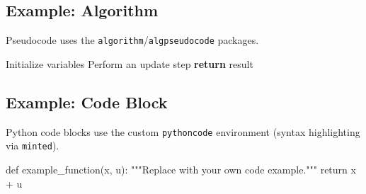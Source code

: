 \subsection{Example: Algorithm}
\noindent\hspace*{\parindent} Pseudocode uses the \texttt{algorithm}/\texttt{algpseudocode} packages.

\begin{algorithm}[H]
    \caption{Example Algorithm}
    \begin{algorithmic}[1]
        \State Initialize variables
            \State Perform an update step
        \EndFor
        \State \textbf{return} result
    \end{algorithmic}
\end{algorithm}

\subsection{Example: Code Block}
\noindent\hspace*{\parindent} Python code blocks use the custom \texttt{pythoncode} environment (syntax highlighting via \texttt{minted}).

\begin{pythoncode}
def example_function(x, u):
    """Replace with your own code example."""
    return x + u
\end{pythoncode}
